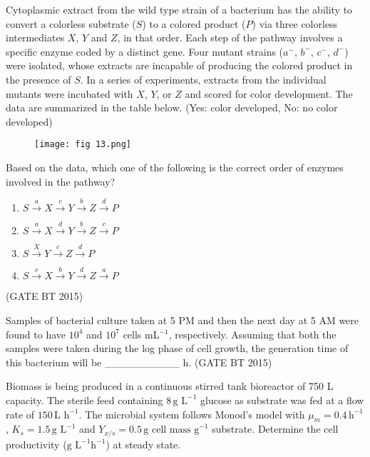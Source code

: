 \item Cytoplasmic extract from the wild type strain of a bacterium has the ability to convert a colorless substrate ($S$) to a colored product ($P$) via three colorless intermediates $X$, $Y$ and $Z$, in that order. Each step of the pathway involves a specific enzyme coded by a distinct gene. Four mutant strains ($a^-$, $b^-$, $c^-$, $d^-$) were isolated, whose extracts are incapable of producing the colored product in the presence of $S$. In a series of experiments, extracts from the individual mutants were incubated with $X$, $Y$, or $Z$ and scored for color development. The data are summarized in the table below. (Yes: color developed, No: no color developed)  

\begin{figure}[H]
\centering
\texttt{[image: fig 13.png]}
\caption{}
\label{fig:Q62}
\end{figure}

Based on the data, which one of the following is the correct order of enzymes involved in the pathway?  

\begin{multicols}{2}
\begin{enumerate}
\item $S \xrightarrow{a} X \xrightarrow{c} Y \xrightarrow{b} Z \xrightarrow{d} P$
\item $S \xrightarrow{a} X \xrightarrow{d} Y \xrightarrow{b} Z \xrightarrow{c} P$
\item $S \xrightarrow{X} Y \xrightarrow{c} Z \xrightarrow{d} P$
\item $S \xrightarrow{c} X \xrightarrow{b} Y \xrightarrow{d} Z \xrightarrow{a} P$
\end{enumerate}
\end{multicols}\hfill (GATE BT 2015)



\item Samples of bacterial culture taken at 5 PM and then the next day at 5 AM were found to have $10^4$ and $10^7$ cells mL$^{-1}$, respectively. Assuming that both the samples were taken during the log phase of cell growth, the generation time of this bacterium will be \_\_\_\_\_\_\_\_\_\_ h.
\hfill (GATE BT 2015)



\item Biomass is being produced in a continuous stirred tank bioreactor of 750 L capacity. The sterile feed containing $8 \, \text{g L}^{-1}$ glucose as substrate was fed at a flow rate of $150 \, \text{L h}^{-1}$. The microbial system follows Monod’s model with $\mu_m = 0.4 \, \text{h}^{-1}$, $K_s = 1.5 \, \text{g L}^{-1}$ and $Y_{x/s} = 0.5 \, \text{g cell mass g}^{-1}$ substrate. Determine the cell productivity ($\text{g L}^{-1}\text{h}^{-1}$) at steady state.  

